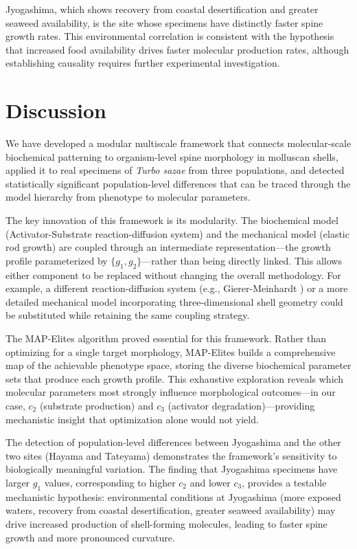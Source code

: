 \documentclass[11pt]{article}
\begin{document}
Jyogashima, which shows recovery from coastal desertification \citep{isono2016} and greater seaweed availability, is the site whose specimens have distinctly faster spine growth rates. This environmental correlation is consistent with the hypothesis that increased food availability drives faster molecular production rates, although establishing causality requires further experimental investigation.

\section{Discussion}

We have developed a modular multiscale framework that connects molecular-scale biochemical patterning to organism-level spine morphology in molluscan shells, applied it to real specimens of \textit{Turbo sazae} from three populations, and detected statistically significant population-level differences that can be traced through the model hierarchy from phenotype to molecular parameters.

The key innovation of this framework is its modularity. The biochemical model (Activator-Substrate reaction-diffusion system) and the mechanical model (elastic rod growth) are coupled through an intermediate representation---the growth profile parameterized by $\{g_1, g_2\}$---rather than being directly linked. This allows either component to be replaced without changing the overall methodology. For example, a different reaction-diffusion system (e.g., Gierer-Meinhardt \citep{gierer1972}) or a more detailed mechanical model incorporating three-dimensional shell geometry \citep{chirat2013} could be substituted while retaining the same coupling strategy.

The MAP-Elites algorithm \citep{mouret2015} proved essential for this framework. Rather than optimizing for a single target morphology, MAP-Elites builds a comprehensive map of the achievable phenotype space, storing the diverse biochemical parameter sets that produce each growth profile. This exhaustive exploration reveals which molecular parameters most strongly influence morphological outcomes---in our case, $c_2$ (substrate production) and $c_3$ (activator degradation)---providing mechanistic insight that optimization alone would not yield.

The detection of population-level differences between Jyogashima and the other two sites (Hayama and Tateyama) demonstrates the framework's sensitivity to biologically meaningful variation. The finding that Jyogashima specimens have larger $g_1$ values, corresponding to higher $c_2$ and lower $c_3$, provides a testable mechanistic hypothesis: environmental conditions at Jyogashima (more exposed waters, recovery from coastal desertification, greater seaweed availability) may drive increased production of shell-forming molecules, leading to faster spine growth and more pronounced curvature.
\end{document}

